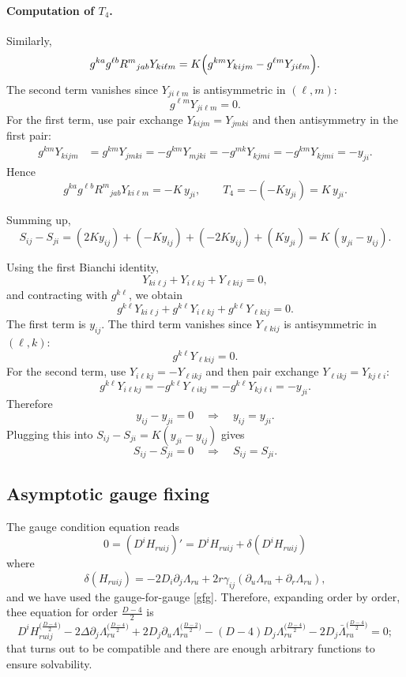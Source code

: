 \documentclass[a4paper,12pt]{article}
\begin{document}
\paragraph{Computation of \(T_4\).}
Similarly,
\[
g^{ka} g^{\ell b} R^{m}{}_{j a b} Y_{k i \ell m}
= K\Bigl(g^{km} Y_{k i j m} - g^{\ell m} Y_{j i \ell m}\Bigr).
\]
The second term vanishes since \(Y_{j i \ell m}\) is antisymmetric in \((\ell,m)\):
\[
g^{\ell m} Y_{j i \ell m} = 0.
\]
For the first term, use pair exchange \(Y_{k i j m} = Y_{j m k i}\) and then antisymmetry in the first pair:
\[
\begin{aligned}
g^{km} Y_{k i j m}
&= g^{km} Y_{j m k i}
= - g^{km} Y_{m j k i}
= - g^{mk} Y_{k j m i}
= - g^{km} Y_{k j m i}
= - y_{ji}.
\end{aligned}
\]
Hence
\[
g^{ka} g^{\ell b} R^{m}{}_{j a b} Y_{k i \ell m} = -K\, y_{ji},
\qquad
T_4 = -(-K y_{ji}) = K\, y_{ji}.
\]

Summing up,
\[
S_{ij} - S_{ji}
= (2K y_{ij}) + (-K y_{ij}) + (-2K y_{ij}) + (K y_{ji})
= K\,(y_{ji} - y_{ij}).
\]


Using the first Bianchi identity,
\[
Y_{k i \ell j} + Y_{i \ell k j} + Y_{\ell k i j} = 0,
\]
and contracting with \(g^{k\ell}\), we obtain
\[
g^{k\ell} Y_{k i \ell j} + g^{k\ell} Y_{i \ell k j} + g^{k\ell} Y_{\ell k i j} = 0.
\]
The first term is \(y_{ij}\).
The third term vanishes since \(Y_{\ell k i j}\) is antisymmetric in \((\ell,k)\):
\[
g^{k\ell} Y_{\ell k i j} = 0.
\]
For the second term, use \(Y_{i \ell k j} = -Y_{\ell i k j}\) and then pair exchange \(Y_{\ell i k j} = Y_{k j \ell i}\):
\[
g^{k\ell} Y_{i \ell k j}
= - g^{k\ell} Y_{\ell i k j}
= - g^{k\ell} Y_{k j \ell i}
= - y_{ji}.
\]
Therefore
\[
y_{ij} - y_{ji} = 0 \quad\Longrightarrow\quad y_{ij} = y_{ji}.
\]
Plugging this into \(S_{ij}-S_{ji} = K(y_{ji}-y_{ij})\) gives
\[
S_{ij} - S_{ji} = 0 \quad\Longrightarrow\quad S_{ij} = S_{ji}.
\]

\subsection{Asymptotic gauge fixing}\label{agfa}
The gauge condition equation reads
\begin{equation}
    0=(D^iH_{ruij})'=D^iH_{ruij}+\delta (D^iH_{ruij})
\end{equation}
where 
\begin{equation}
    \delta(H_{ruij})=-2D_i\partial_j\Lambda_{ru}+2r\gamma_{ij}(\partial_u\Lambda_{ru}+\partial_r\Lambda_{ru}),
\end{equation}
and we have used the gauge-for-gauge \eqref{gfg}.
Therefore, expanding order by order, thee equation for order $\frac{D-4}{2}$ is
\begin{equation}
    D^iH_{ruij}^{\big(\frac{D-4}{2}\big)}-2\Delta\partial_j\Lambda_{ru}^{\big(\frac{D-4}{2}\big)}+2D_j\partial_u\Lambda_{ru}^{\big(\frac{D-2}{2}\big)}-(D-4)D_j\Lambda_{ru}^{\big(\frac{D-4}{2}\big)}-2D_j\bar{\Lambda}_{ru}^{\big(\frac{D-4}{2}\big)}=0;
\end{equation}
that turns out to be compatible and there are enough arbitrary functions to ensure solvability.
\end{document}
